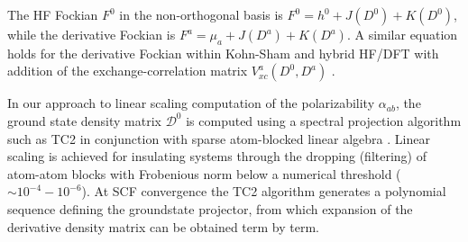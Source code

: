 \documentclass[prl,aps,preprint,showpacs,superbib]{revtex4}
\begin{document}
The HF Fockian $F^0$ in the non-orthogonal basis is $F^0=h^0+J(D^0)+K(D^0)$, while 
the derivative Fockian is $F^a=\mu_a+J(D^a)+K(D^a)$.  A similar equation holds for the derivative Fockian 
within Kohn-Sham and hybrid HF/DFT with addition of the exchange-correlation 
matrix $V_{xc}^a(D^0,D^a)$ \cite{Lee_1994}.

In our approach to linear scaling computation of the polarizability $\alpha_{ab}$, the ground state 
density matrix $\mathcal{D}^0$ is computed using a spectral projection algorithm such 
as TC2 \cite{ANiklasson02A} in conjunction with sparse atom-blocked linear algebra \cite{ANiklasson03,MChallacombe00B}.  
Linear scaling is achieved for insulating systems through the dropping (filtering) of atom-atom 
blocks with Frobenious norm below a numerical threshold ($\sim 10^{-4}-10^{-6}$).
At SCF convergence the TC2 algorithm generates a polynomial sequence defining the groundstate projector, 
from which expansion of the derivative density matrix can be obtained term by term.
\end{document}
